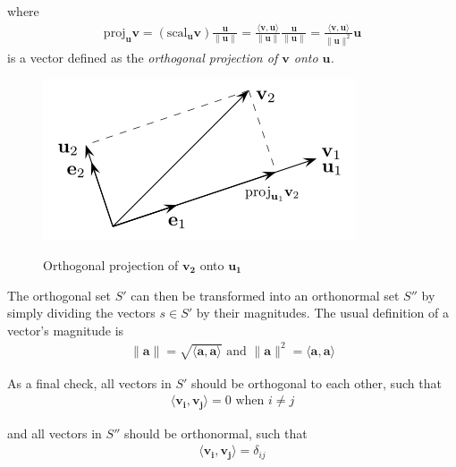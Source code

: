 \documentclass[a4paper,10pt]{report}
\newcommand{\norm}[1]{\lVert#1\rVert} 		%
\newcommand{\ip}[2]{\langle#1,#2\rangle}	%
\newcommand{\vb}[1]{\mathbf{#1}}		%
\begin{document}
    where
    \begin{align*}
      \text{proj}_{\mathbf{u}} \mathbf{v} = (\text{scal}_{\mathbf{u}} \mathbf{v})\frac{\mathbf{u}}{\mathbf{\norm{u}}}
      = \frac{\langle \mathbf{v,u} \rangle}{\norm{\mathbf{u}}}\frac{\mathbf{u}}{\mathbf{\norm{u}}}
      = \frac{\ip{\vb{v}}{\vb{u}}}{\norm{\vb{u}}^2}\vb{u}
    \end{align*}
    is a vector defined as the \textit{orthogonal projection of $\vb{v}$ onto $\vb{u}$.}

      \begin{figure}[htpb]
      \begin{centering}
      \begin{center}
      \includegraphics[width=\linewidth]{figures/projection.png}
      \label{fig:projection}
      \caption{Orthogonal projection of $\vb{v_2}$ onto $\vb{u_1}$}
      \end{center}
      \par\end{centering}
      \end{figure}

    The orthogonal set $S'$ can then be transformed into an orthonormal set $S''$ by simply dividing the vectors $s\in S'$ by their magnitudes. The usual definition of a vector's magnitude is
    \begin{align*}
    \norm{\vb{a}} = \sqrt{\ip{\vb{a}}{\vb{a}}} \text{ and } \norm{\vb{a}}^2 = \ip{\vb{a}}{\vb{a}}
    \end{align*}

    As a final check, all vectors in $S'$ should be orthogonal to each other, such that
    \begin{align*}
    \ip{\vb{v_i}}{\vb{v_j}} = 0 \text{ when } i \neq j
    \end{align*}

    and all vectors in $S''$ should be orthonormal, such that
    \begin{align*}
    \ip{\vb{v_i}}{\vb{v_j}} = \delta_{ij}
    \end{align*}
\end{document}

